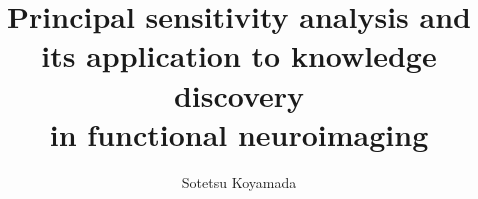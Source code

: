 \documentclass[a4paper]{scrartcl}
\begin{document}
\title{
Principal sensitivity analysis and\\its application to knowledge discovery\\in functional neuroimaging
}

\author{
Sotetsu Koyamada
}

\date{}

\maketitle

\clearpage
\tableofcontents
\clearpage

\clearpage

\clearpage

\clearpage

\clearpage

\clearpage

\clearpage


\clearpage
\appendix

\end{document}
